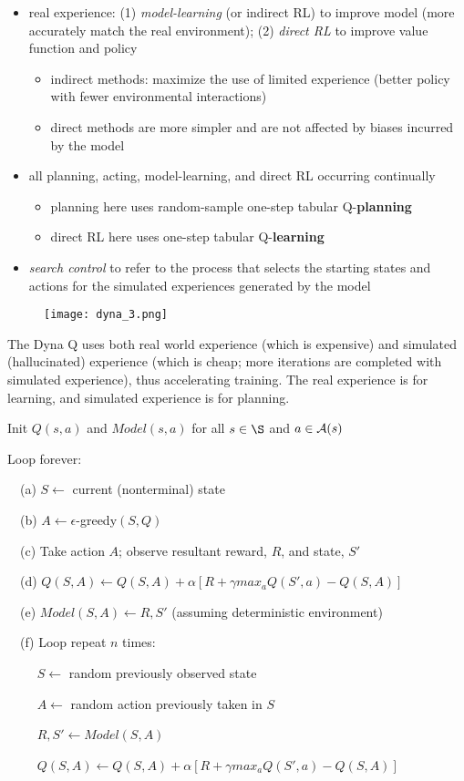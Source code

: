 \documentclass[sutton_barto_notes.tex]{subfiles}
\begin{document}
\begin{itemize}
\item real experience: (1) \textit{model-learning} (or indirect RL) to improve model (more accurately match the real environment); (2) \textit{direct RL} to improve value function and policy
\begin{itemize}
	\item indirect methods: maximize the use of limited experience (better policy with fewer environmental interactions)
	\item direct methods are more simpler and are not affected by biases incurred by the model
\end{itemize}
\item all planning, acting, model-learning, and direct RL occurring continually
\begin{itemize}
	\item planning here uses random-sample one-step tabular Q-\textbf{planning}
	\item direct RL here uses one-step tabular Q-\textbf{learning}
\end{itemize}
\item \textit{search control} to refer to the process that selects the starting states and actions for the simulated experiences generated by the model
\end{itemize}

\begin{figure}[!h]
  \centering
  \texttt{[image: dyna\_3.png]}
  \label{fig:dyna}
\end{figure}

The Dyna Q uses both real world experience (which is expensive) and simulated (hallucinated) experience (which is cheap; more iterations are completed with simulated experience), thus accelerating training. The real experience is for learning, and simulated experience is for planning.

\begin{tcolorbox}[width=1.1\textwidth,title={Tabular Dyna-Q}]
Init $Q(s,a)$ and $Model(s,a)$ for all $s \in \S$ and $a \in \operatorname*{\mathcal{A}}(s)$

Loop forever:

$\quad$(a) $S \leftarrow$ current (nonterminal) state

$\quad$(b) $A \leftarrow \epsilon$-greedy$(S,Q)$

$\quad$(c) Take action $A$; observe resultant reward, $R$, and state, $S'$

$\quad$(d) $Q(S,A)\leftarrow Q(S,A)+\alpha [R + \gamma max_a Q(S',a) - Q(S,A)]$

$\quad$(e) $Model(S,A) \leftarrow R,S'$ (assuming deterministic environment)

$\quad$(f) Loop repeat $n$ times:

$\quad\quad$ $S \leftarrow$ random previously observed state

$\quad\quad$ $A \leftarrow$ random action previously taken in $S$

$\quad\quad$ $R, S' \leftarrow Model(S,A)$

$\quad\quad$ $Q(S,A)\leftarrow Q(S,A)+\alpha [R+\gamma max_a Q(S',a) - Q(S,A)]$
\end{tcolorbox}
\end{document}
